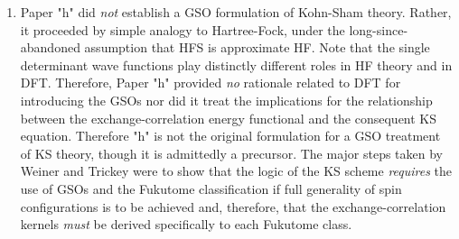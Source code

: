 \begin{enumerate}
\item Paper "h" did {\em not} establish a GSO formulation of Kohn-Sham
theory. Rather, it  proceeded by simple analogy to Hartree-Fock, under the
long-since-abandoned  assumption that HFS is approximate HF. Note that the 
single determinant wave functions play distinctly different roles in  HF
theory and in DFT. Therefore, Paper "h" provided {\em no} rationale  related
to DFT for introducing the GSOs nor did it treat the  implications for the
relationship between the exchange-correlation  energy functional and the
consequent KS equation. Therefore "h"  is not the original formulation for a
GSO treatment of KS theory,  though it is admittedly a precursor. The major
steps taken  by Weiner and Trickey  were to show that the logic of the KS
scheme {\em requires} the use of  GSOs and the Fukutome classification if
full generality of spin  configurations is to be achieved and, therefore,
that the  exchange-correlation kernels {\em must} be derived specifically to
each Fukutome class.
\end{enumerate}


